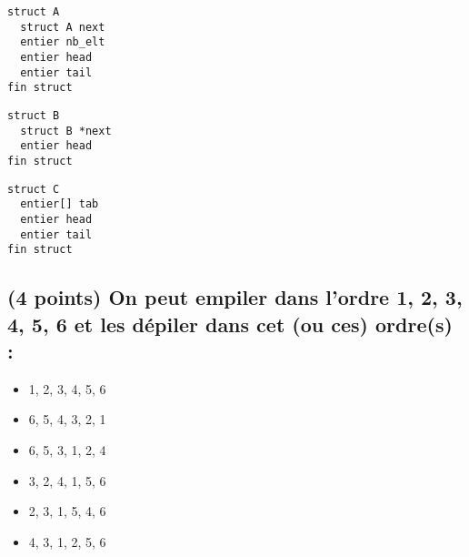\documentclass[11pt,a4paper]{article}
\begin{document}
\begin{table}[ht!]
  \centering
  \begin{minipage}{0.28\textwidth}
    \centering
\begin{lstlisting}[style=algorithmique]
struct A
  struct A next
  entier nb_elt
  entier head
  entier tail
fin struct \end{lstlisting}
  \CaseCoche
  \end{minipage}
  \hfillx
  \begin{minipage}{0.28\textwidth}
    \centering
\begin{lstlisting}[style=algorithmique]
struct B
  struct B *next
  entier head
fin struct \end{lstlisting}
  \CaseCoche
  \end{minipage}
  \hfillx
  \begin{minipage}{0.28\textwidth}
    \centering
\begin{lstlisting}[style=algorithmique]
struct C
  entier[] tab
  entier head
  entier tail
fin struct \end{lstlisting}
  \CaseCoche
  \end{minipage}
\end{table}


\bigskip
\vspace*{1cm}


\subsection{(4 points) On peut empiler dans l'ordre 1, 2, 3, 4, 5, 6 et les dépiler dans cet (ou ces) ordre(s) : }


\begin{table}[ht!]
  \centering
  \begin{minipage}{0.45\textwidth}
    \centering
\begin{itemize}
  \item[\CaseCoche] 1, 2, 3, 4, 5, 6
  \item[\CaseCoche] 6, 5, 4, 3, 2, 1
  \item[\CaseCoche] 6, 5, 3, 1, 2, 4
\end{itemize}
  \end{minipage}
  \hfillx
  \begin{minipage}{0.45\textwidth}
    \centering
\begin{itemize}
  \item[\CaseCoche] 3, 2, 4, 1, 5, 6
  \item[\CaseCoche] 2, 3, 1, 5, 4, 6
  \item[\CaseCoche] 4, 3, 1, 2, 5, 6
\end{itemize}
  \end{minipage}
\end{table}
\end{document}
